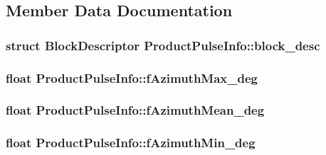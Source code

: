 \subsection{Member Data Documentation}
\hypertarget{structProductPulseInfo_a643f5aab4f0ca778b5fa7893b8d5c6b7}{
\subsubsection[{block\-\_\-desc}]{\setlength{\rightskip}{0pt plus 5cm}struct {\bf Block\-Descriptor} Product\-Pulse\-Info\-::block\-\_\-desc}}\label{structProductPulseInfo_a643f5aab4f0ca778b5fa7893b8d5c6b7}
\hypertarget{structProductPulseInfo_a06e33120f4732487c2a81ebb7e76b39c}{
\subsubsection[{f\-Azimuth\-Max\-\_\-deg}]{\setlength{\rightskip}{0pt plus 5cm}float Product\-Pulse\-Info\-::f\-Azimuth\-Max\-\_\-deg}}\label{structProductPulseInfo_a06e33120f4732487c2a81ebb7e76b39c}
\hypertarget{structProductPulseInfo_a507c4695328a2597877ae114bbdb13a4}{
\subsubsection[{f\-Azimuth\-Mean\-\_\-deg}]{\setlength{\rightskip}{0pt plus 5cm}float Product\-Pulse\-Info\-::f\-Azimuth\-Mean\-\_\-deg}}\label{structProductPulseInfo_a507c4695328a2597877ae114bbdb13a4}
\hypertarget{structProductPulseInfo_ad76848dc6a038ffeb3f15c62fec8455d}{
\subsubsection[{f\-Azimuth\-Min\-\_\-deg}]{\setlength{\rightskip}{0pt plus 5cm}float Product\-Pulse\-Info\-::f\-Azimuth\-Min\-\_\-deg}}\label{structProductPulseInfo_ad76848dc6a038ffeb3f15c62fec8455d}
